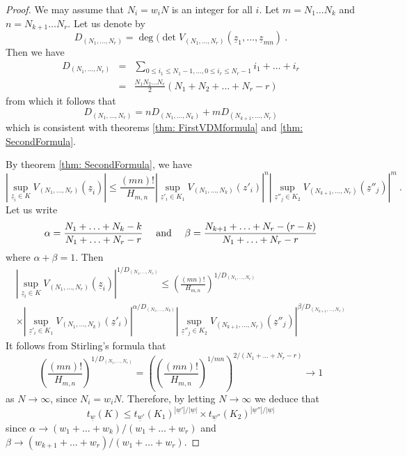 \documentclass[10pt]{amsart}
\theoremstyle{definition}
\theoremstyle{remark}
\numberwithin{equation}{section}
\newcommand{\To}{\longrightarrow}
\newcommand{\z}{\underline{z}}
\newcommand{\0}{\color{blue}{\mathsf{0}}}
\begin{document}
\begin{proof} We may assume that $N_i=w_i N $ is an integer for all $i$.  Let $m=  N_1\ldots N_k$ and $n=  N_{k+1}\ldots N_r$. Let us denote by 
\begin{equation}
D_{(N_1,\ldots ,N_r)}  =      \deg (\det V_{(N_1,\ldots,  N_r)}(\z_1,\ldots, 
\z_{mn}) \ . 
\end{equation}
Then we have 
\begin{eqnarray}  D_{(N_1,\ldots ,N_r)}  &=  & \sum_{ 0 \leq i_1\leq  N_1-1, \ldots,   0 \leq i_r\leq N_r-1} i_1+ \ldots +i_r   \\
& =&  \frac{N_1 N_2 \ldots N_r}{2} ( N_1+ N_2 + \ldots +  N_r - r )  \nonumber
\end{eqnarray} 
from which it follows that 
\[  D_{(N_1,\ldots ,N_r) }  = n  D_{(N_1,\ldots ,N_k) }   +   m D_{(N_{k+1},\ldots ,N_r)}  \]
which is consistent with theorems \ref{thm: FirstVDMformula} and \ref{thm: SecondFormula}.


 By theorem  \ref{thm: SecondFormula}, we have
\[  \left| \sup_{\z_i \in K} V_{(N_1,\ldots, N_r)} (\z_i) \right| \leq \frac{(mn)!}{H_{m,n}} \left|  \sup_{\z'_i \in K_1} V_{(N_1,\ldots,N_k)}(z'_i) \right|^{n} \left|  \sup_{\z''_j \in K_2} V_{( N_{k+1},\ldots, N_r)} (\z''_j)\right|^{m}   \ .\]
Let us write 
\[ \alpha  = \frac{ N_1 + \ldots +  N_k - k } {N_1+ \ldots +N_r- r} \quad \hbox{ and } \quad \beta= \frac{  N_{k+1} + \ldots + N_r -(r-k)} {N_1+ \ldots +N_r-r}  \]
where $\alpha+ \beta =1$. Then
\begin{multline*}   \left| \sup_{\z_i \in K} V_{( N_1,\ldots, N_r)} (\z_i) \right|^{1/D_{(N_1,\ldots, N_r)}} \leq  \left( \frac{(mn)!}{H_{m,n}}\right)^{1/D_{(N_1,\ldots, N_r)}}\\
 \times  \left|  \sup_{\z'_i \in K_1} V_{(N_1,\ldots, N_k)}(\z'_i) \right|^{\alpha / D_{(N_1,\ldots, N_k) }} \left|  \sup_{\z''_j \in K_2} V_{(N_{k+1},\ldots,  N_r)} (\z''_j)\right|^{\beta / D_{(N_{k+1},\ldots, N_{r})}} \end{multline*}
 It  follows from  Stirling's formula that
  \[   \left( \frac{(mn)!}{H_{m,n}}\right)^{1/D_{(N_1,\ldots, N_r) }}  = \left( \left(\frac{(mn)!}{H_{m,n}}\right)^{1/mn} \right)^{2/{(N_1+\ldots+ N_r-r)}} \To 1\]
 as $N\rightarrow \infty$, since    $N_i = w_i N$.  Therefore, by letting $N\rightarrow \infty$ we deduce that 
  \[  t_{\underline{w}}(K) \leq  t_{\underline{w}'}(K_1)^{|\underline{w}'|/|\underline{w}|} \times t_{\underline{w}''}(K_2)^{|\underline{w}''|/|\underline{w}|} \]
since $\alpha \rightarrow   (w_1+\ldots +w_k)/(w_1+\ldots +w_r)  $ and $\beta \rightarrow (w_{k+1}+\ldots +w_r)/(w_1+\ldots +w_r)$.


\end{proof}
\end{document}
